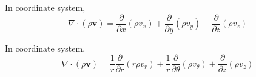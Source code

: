 \documentclass{llncs}
\numberwithin{equation}{section}
\numberwithin{figure}{section}
\numberwithin{table}{section}
\begin{document}
    In coordinate system,
    \begin{equation}
        \nabla \cdot \left( \rho \mathbf{v} \right)=\frac{\partial }{\partial x}\left( \rho {{v}_{x}} \right)+\frac{\partial }{\partial y}\left( \rho {{v}_{y}} \right)+\frac{\partial }{\partial z}\left( \rho {{v}_{z}} \right)
        \label{continuity_Cartesian}
    \end{equation}

    In coordinate system,
    \begin{equation}
        \nabla \cdot \left( \rho \mathbf{v} \right)=\frac{1}{r}\frac{\partial }{\partial r}\left( r\rho {{v}_{r}} \right)+\frac{1}{r}\frac{\partial }{\partial \theta }\left( \rho {{v}_{\theta }} \right)+\frac{\partial }{\partial z}\left( \rho {{v}_{z}} \right)
        \label{continuity_cylindrical}
    \end{equation}
\end{document}
